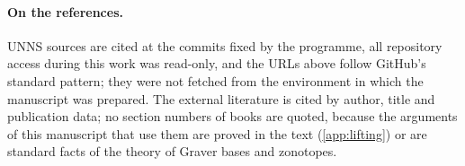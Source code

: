\paragraph{On the references.} UNNS sources are cited at the commits fixed by the programme, all repository access during this work was read-only, and the URLs above follow GitHub's standard pattern; they were not fetched from the environment in which the manuscript was prepared. The external literature is cited by author, title and publication data; no section numbers of books are quoted, because the arguments of this manuscript that use them are proved in the text (\cref{app:lifting}) or are standard facts of the theory of Graver bases and zonotopes.
